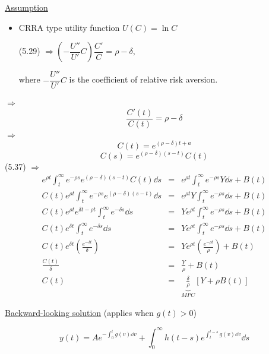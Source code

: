 \documentclass[twoside]{article}
\newcommand\imp{$\Longrightarrow$}
\begin{document}
\underline{Assumption}
\begin{itemize}
    \item CRRA type utility function $U(C) = \ln C$

    (5.29) \imp ${ \left (- \dfrac{U''}{U'}C \right )} \dfrac{C'}{C} = \rho - \delta,$ 

    where $ -\dfrac{U''}{U'}C $ is the coefficient of relative risk aversion.
\end{itemize}
\imp \begin{equation}
    \frac{C'(t)}{C(t)} = \rho - \delta
\end{equation}
\imp
\begin{equation}
    C(t) = e^{(\rho - \delta)t + a}
\end{equation}
\begin{equation}
    C(s) = e^{(\rho - \delta)(s-t)} C(t)
\end{equation}
(5.37) \imp
\begin{eqnarray}
    e^{\rho t} \int_t^{\infty} e^{ - \rho s} e^{(\rho - \delta)(s-t)} C(t) \dd s &=&  e^{\rho t} \int_t^{\infty} e^{ - \rho s} Y \dd s + B(t)\\
    C(t) e^{\rho t} \int_t^{\infty} e^{ - \rho s} e^{(\rho - \delta)(s-t)}  \dd s &=&  e^{\rho t} Y \int_t^{\infty} e^{ - \rho s} \dd s + B(t)\\
    C(t) e^{\rho t} e^{ \delta t - \rho t} \int_t^{\infty} e^{-\delta s}  \dd s &=&   Y e^{\rho t}\int_t^{\infty} e^{ - \rho s} \dd s + B(t)\\
    C(t) e^{ \delta t} \int_t^{\infty} e^{-\delta s}  \dd s &=&   Y e^{\rho t}\int_t^{\infty} e^{ - \rho s} \dd s + B(t)\\
    C(t)e^{\delta t} (\frac{e^{-\delta t}}{\delta})&=& Ye^{\rho t} (\frac{e^{-\rho t}}{\rho}) + B(t)\\
    \frac{C(t)}{\delta}&=& \frac{Y}{\rho} + B(t)\\
    C(t) &=& \underbrace{\frac{\delta}{\rho}}_{MPC}[Y+\rho B(t)]
\end{eqnarray}

\underline{Backward-looking solution} (applies when $g(t)>0$)

\begin{equation}
    y(t) = A e^{-\int_0^t g(v) \dd v } + \int_0^{\infty} h(t-s) e^{\int_t^{t-s} g(v) \dd v } \dd s
\end{equation}
\end{document}
